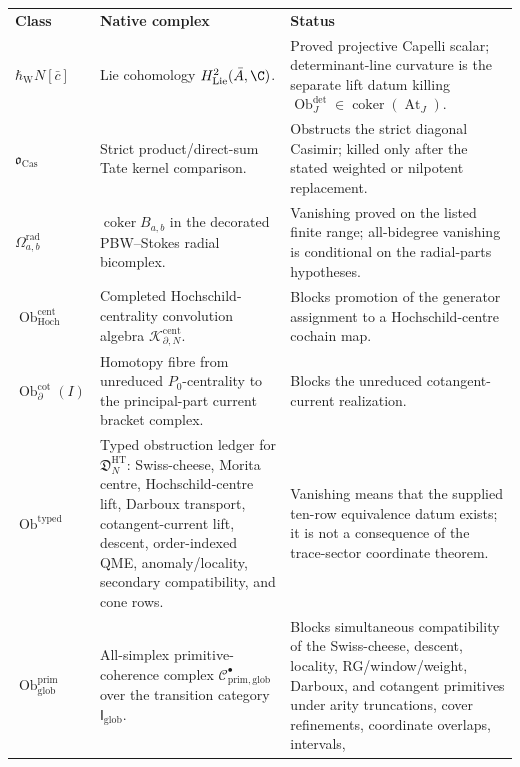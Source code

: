 \begin{center}
\footnotesize
\renewcommand{\arraystretch}{1.15}
\begin{tabular}{@{}>{\raggedright\arraybackslash}p{}
  >{\raggedright\arraybackslash}p{}
  >{\raggedright\arraybackslash}p{}@{}}
\textbf{Class} & \textbf{Native complex} & \textbf{Status} \\
\(\hbar_{\mathrm{W}}N[\bar c]\) &
Lie cohomology \(H^2_{\mathrm{Lie}}(\bar A,\C)\). &
Proved projective Capelli scalar; determinant-line curvature is the
separate lift datum killing
\(\operatorname{Ob}^{\det}_J\in\operatorname{coker}(\operatorname{At}_J)\). \\
\(\mathfrak o_{\mathrm{Cas}}\) &
Strict product/direct-sum Tate kernel comparison. &
Obstructs the strict diagonal Casimir; killed only after the stated
weighted or nilpotent replacement. \\
\(\Omega^{\mathrm{rad}}_{a,b}\) &
\(\operatorname{coker}B_{a,b}\) in the decorated PBW--Stokes radial
bicomplex. &
Vanishing proved on the listed finite range; all-bidegree vanishing is
conditional on the radial-parts hypotheses. \\
\(\operatorname{Ob}^{\mathrm{cent}}_{\mathrm{Hoch}}\) &
Completed Hochschild-centrality convolution algebra
\(\mathcal K^{\mathrm{cent}}_{\partial,N}\). &
Blocks promotion of the generator assignment to a Hochschild-centre
cochain map. \\
\(\operatorname{Ob}^{\mathrm{cot}}_\partial(I)\) &
Homotopy fibre from unreduced \(P_0\)-centrality to the
principal-part current bracket complex. &
Blocks the unreduced cotangent-current realization. \\
\(\operatorname{Ob}^{\mathrm{typed}}\) &
Typed obstruction ledger for
\(\mathfrak D^{\mathrm{HT}}_N\): Swiss-cheese, Morita centre,
Hochschild-centre lift, Darboux transport, cotangent-current lift,
descent, order-indexed QME, anomaly/locality, secondary compatibility,
and cone rows. &
Vanishing means that the supplied ten-row equivalence datum exists; it is
not a consequence of the trace-sector coordinate theorem. \\
\(\operatorname{Ob}^{\mathrm{prim}}_{\mathrm{glob}}\) &
All-simplex primitive-coherence complex
\(\mathcal C^\bullet_{\mathrm{prim,glob}}\) over the transition
category \(\mathsf I_{\mathrm{glob}}\). &
Blocks simultaneous compatibility of the Swiss-cheese, descent,
locality, RG/window/weight, Darboux, and cotangent primitives under
arity truncations, cover refinements, coordinate overlaps, intervals,

\end{tabular}
\end{center}
